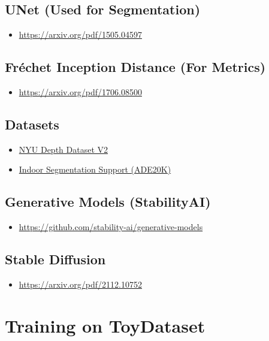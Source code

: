 \documentclass[12pt,a4paper]{report}
\begin{document}
\section*{UNet (Used for Segmentation)}
\begin{itemize}
    \item \href{https://arxiv.org/pdf/1505.04597}{https://arxiv.org/pdf/1505.04597}
\end{itemize}

\section*{Fréchet Inception Distance (For Metrics)}
\begin{itemize}
    \item \href{https://arxiv.org/pdf/1706.08500}{https://arxiv.org/pdf/1706.08500}
\end{itemize}

\section*{Datasets}
\begin{itemize}
    \item \href{https://cs.nyu.edu/~fergus/datasets/nyu_depth_v2.html}{NYU Depth Dataset V2}
    \item \href{https://cs.nyu.edu/~fergus/datasets/indoor_seg_support.pdf}{Indoor Segmentation Support (ADE20K)}
\end{itemize}

\section*{Generative Models (StabilityAI)}
\begin{itemize}
    \item \href{https://github.com/stability-ai/generative-models}{https://github.com/stability-ai/generative-models}
\end{itemize}

\section*{Stable Diffusion}
\begin{itemize}
    \item \href{https://arxiv.org/pdf/2112.10752}{https://arxiv.org/pdf/2112.10752}
\end{itemize}


\chapter*{Training on ToyDataset}
\end{document}
